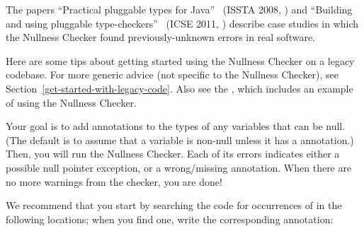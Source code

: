 
The papers ``Practical pluggable types for Java''~\cite{PapiACPE2008}
(ISSTA 2008,
)
and ``Building and using pluggable type-checkers''~\cite{DietlDEMS2011}
(ICSE 2011,
)
describe case studies in which the Nullness Checker found
previously-unknown errors in real software.



Here are some tips about getting started using the Nullness Checker on a
legacy codebase.  For more generic advice (not specific to the Nullness
Checker), see Section~\ref{get-started-with-legacy-code}.  Also see the
, which includes an example of using the Nullness Checker.

Your goal is to add  annotations
to the types of any variables that can be null.  (The default is to assume
that a variable is non-null unless it has a  annotation.)
Then, you will run the Nullness Checker.  Each of its errors indicates
either a possible null pointer exception, or a wrong/missing annotation.
When there are no more warnings from the checker, you are done!

We recommend that you start by searching the code for occurrences of
 in the following locations; when you find one, write the
corresponding annotation:

